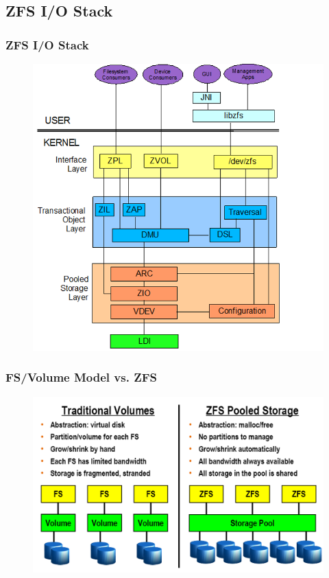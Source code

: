 \subsection{ZFS I/O Stack} %
\begin{frame}[fragile]
    \frametitle{ZFS I/O Stack}
    \begin{figure}
    \includegraphics[width=0.47\linewidth]{figs/ZFS-stack.png}
    \end{figure}  
\end{frame}
% 
% 
\begin{frame}[fragile]
    \frametitle{FS/Volume Model vs. ZFS}
    \begin{figure}
    \includegraphics[width=0.8\linewidth]{figs/ZFS-pooled-storage.png}
    \end{figure}
\end{frame}
